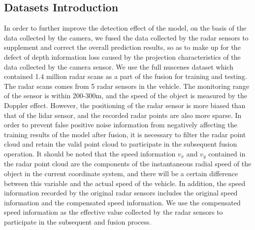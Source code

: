 \documentclass[10pt,twocolumn,letterpaper]{article}
\begin{document}
\subsection{Datasets Introduction}
In order to further improve the detection effect of the model, on the basis of the data collected by the camera, we fused the data collected by the radar sensors to supplement and correct the overall prediction results, so as to make up for the defect of depth information loss caused by the projection characteristics of the data collected by the camera sensor. We use the full nuscenes dataset which contained 1.4 million radar scans as a part of the fusion for training and testing. The radar scans comes from 5 radar sensors in the vehicle. The monitoring range of the sensor is within 200-300m, and the speed of the object is measured by the Doppler effect. However, the positioning of the radar sensor is more biased than that of the lidar sensor, and the recorded radar points are also more sparse\cite{caesar2020nuscenes}. In order to prevent false positive noise information from negatively affecting the training results of the model after fusion, it is necessary to filter the radar point cloud and retain the valid point cloud to participate in the subsequent fusion operation. It should be noted that the speed information \(v_x\) and \(v_y\)  contained in the radar point cloud are the components  of the instantaneous radial speed of the object in the current coordinate system, and there will be a certain difference between this variable and the actual speed of the vehicle\cite{nabati2021centerfusion}. In addition, the speed information recorded by the original radar sensors includes the original speed information and the compensated speed information. We use the compensated speed information as the effective value collected by the radar sensors to participate in the subsequent and fusion process.
\end{document}
